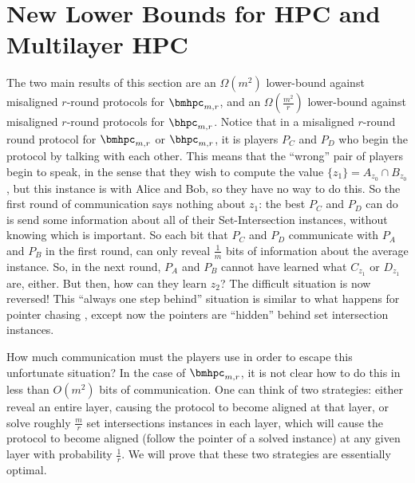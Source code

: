 
\newcommand{\bucket}[1]{\textsf{Bucket} #1}

\section{New Lower Bounds for HPC and Multilayer HPC} \label{sec:lower-bound-hpc}

The two main results of this section are an $\Omega(m^2)$ lower-bound against misaligned $r$-round protocols for $\bmhpc_{m,r}$, and an $\Omega(\frac{m^2}{r})$ lower-bound against misaligned $r$-round protocols for $\bhpc_{m,r}$. Notice that in a misaligned $r$-round round protocol for $\bmhpc_{m,r}$ or $\bhpc_{m,r}$, it is players $P_C$ and $P_D$ who begin the protocol by talking with each other. This means that the ``wrong'' pair of players begin to speak, in the sense that they wish to compute the value $\{z_1\} = A_{z_0} \cap B_{z_0}$, but this instance is with Alice and Bob, so they have no way to do this. So the first round of communication says nothing about $z_1$: the best $P_C$ and $P_D$ can do is send some information about all of their Set-Intersection instances, without knowing which is important. So each bit that $P_C$ and $P_D$ communicate with $P_A$ and $P_B$ in the first round, can only reveal $\frac 1 m$ bits of information about the average instance. So, in the next round, $P_A$ and $P_B$ cannot have learned what $C_{z_1}$ or $D_{z_1}$ are, either. But then, how can they learn $z_2$? The difficult situation is now reversed! This ``always one step behind'' situation is similar to what happens for pointer chasing \cite{NisanW93, PonzioRV99, Yehudayoff20}, except now the pointers are ``hidden'' behind set intersection instances.

\medskip\noindent
How much communication must the players use in order to escape this unfortunate situation? In the case of $\bmhpc_{m,r}$, it is not clear how to do this in less than $O(m^2)$ bits of communication. One can think of two strategies: either reveal an entire layer, causing the protocol to become aligned at that layer, or solve roughly $\frac{m}{r}$ set intersections instances in each layer, which will cause the protocol to become aligned (follow the pointer of a solved instance) at any given layer with probability $\frac{1}{r}$. We will prove that these two strategies are essentially optimal.

